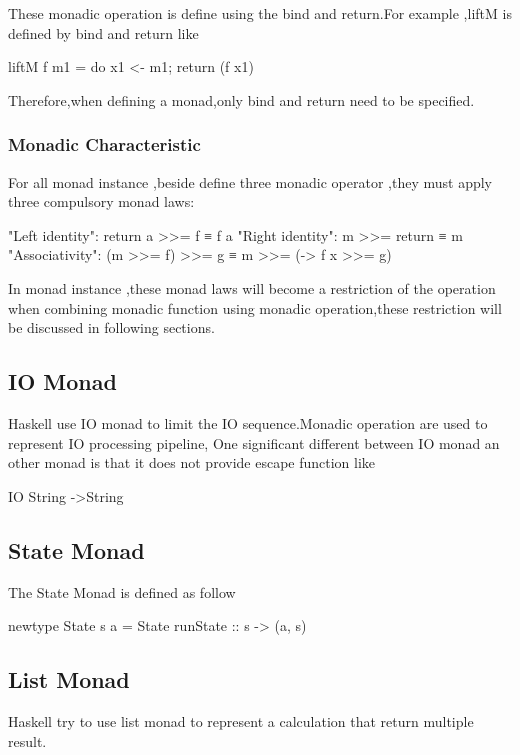 These monadic operation is define using the bind and return.For example ,liftM is defined by bind and return like 
\begin{hcode}
liftM f m1              = do { x1 <- m1; return (f x1) }
\end{hcode}
Therefore,when defining a monad,only bind and return need to be specified.

\subsubsection{Monadic Characteristic}
For all monad instance ,beside define three monadic operator ,they must apply three compulsory monad laws:

\begin{hcode}
"Left identity": return a >>= f  ≡  f a
"Right identity": m >>= return  ≡  m
"Associativity": (m >>= f) >>= g  ≡  m >>= (\x -> f x >>= g)
\end{hcode}

In monad instance ,these monad laws will become a restriction of the operation when combining monadic function using monadic operation,these restriction will be discussed in following sections.


\subsection{IO Monad}
Haskell use IO monad to limit the IO sequence.Monadic operation are used to represent IO processing pipeline,
One significant different between IO monad an other monad is that it does not provide escape function like  
\begin{hcode}
IO String ->String
\end{hcode}

\subsection{State Monad}
The State Monad is defined as follow 
\begin{hcode}
newtype State s a = State {runState :: s -> (a, s)}
\end{hcode}



\subsection{List Monad}
Haskell try to use list monad to represent a calculation that return multiple result.


